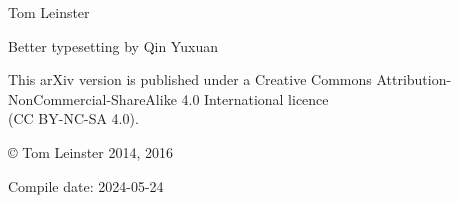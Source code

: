 % 
% 
% 

\thispagestyle{empty}

{%
\vspace*{\fill}

\hfill
{}

\vspace*{2em}
\hfill
{\LARGE Tom Leinster}

\vspace*{1em}
\hfill
{\large Better typesetting by Qin Yuxuan}

}


\newpage
\thispagestyle{empty}

{
\centering\small









This arXiv version is published under a Creative Commons
Attribution-NonCommercial-ShareAlike 4.0 International licence\\ 
(CC BY-NC-SA 4.0).




\copyright{} Tom Leinster 2014, 2016

\vspace*{4em}
Compile date: 2024-05-24

}

\newpage
